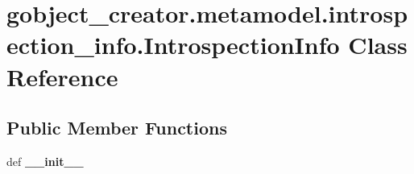 \hypertarget{classgobject__creator_1_1metamodel_1_1introspection__info_1_1IntrospectionInfo}{
\section{gobject\_\-creator.metamodel.introspection\_\-info.IntrospectionInfo Class Reference}
\label{classgobject__creator_1_1metamodel_1_1introspection__info_1_1IntrospectionInfo}
}
\subsection*{Public Member Functions}
\begin{DoxyCompactItemize}
\item 
\hypertarget{classgobject__creator_1_1metamodel_1_1introspection__info_1_1IntrospectionInfo_a17d186ed878951fbf162a40fe2503d47}{
def {\bfseries \_\-\_\-init\_\-\_\-}}
\label{classgobject__creator_1_1metamodel_1_1introspection__info_1_1IntrospectionInfo_a17d186ed878951fbf162a40fe2503d47}

\end{DoxyCompactItemize}
